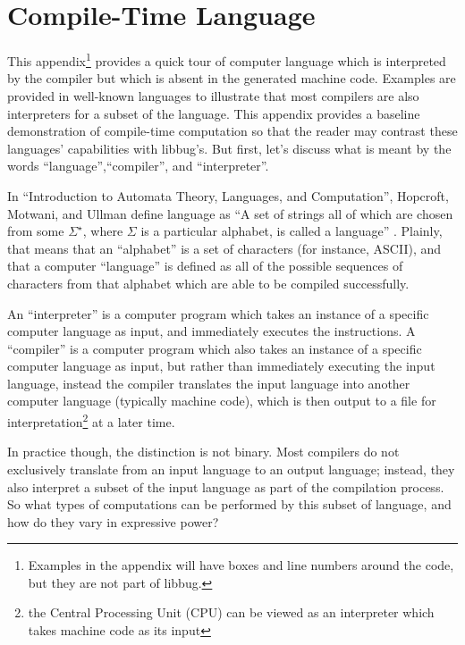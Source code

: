 
\appendix
 \appendixpage
 \noappendicestocpagenum
 \chapter{Compile-Time Language}
  \label{sec:appendix1}
 This appendix\footnote{Examples in the appendix will have boxes
 and line numbers around the code, but they are not part of libbug.}
 provides a quick tour of computer language which is interpreted
 by the compiler but which is absent in the generated machine
 code.  Examples are provided in
 well-known languages to illustrate that
 most compilers are also interpreters for a subset of the language.  This
 appendix provides a baseline demonstration of compile-time computation
 so that the reader may contrast these languages' capabilities with libbug's.
 But first, let's discuss what is meant by the words ``language'',``compiler'', and
 ``interpreter''.

 In ``Introduction to Automata Theory, Languages, and Computation'', Hopcroft,
 Motwani, and Ullman define language as ``A set of strings all of which are chosen
 from some $\Sigma^{\star}$, where $\Sigma$ is a particular alphabet, is called
 a language'' \cite[p. 30]{hmu2001}.
 Plainly, that means that an ``alphabet'' is a set of characters (for instance, ASCII), and
 that a computer ``language'' is defined as all of the possible sequences of characters
 from that alphabet which are able to be compiled successfully.

 An ``interpreter'' is a computer program which takes an instance of a specific
 computer language as input,
 and immediately executes the instructions.  A ``compiler'' is a computer program
 which also takes an instance of a specific computer language as input,
 but rather than immediately executing the input language, instead the compiler
 translates the input language
 into another computer language (typically machine code), which is then output to a file
 for interpretation\footnote{the Central Processing Unit (CPU) can be viewed as an
 interpreter which takes machine code as its input} at a later time.

 In practice though, the distinction is not binary.  Most compilers do not exclusively
 translate from an input language
 to an output language; instead, they also interpret a subset of the input
 language as part of the compilation process.  So what
 types of computations can be performed by this subset of language, and how do
 they vary in expressive power?

